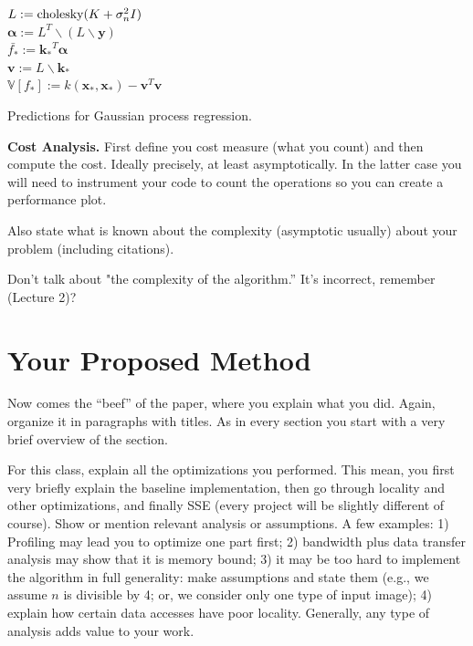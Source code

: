 \documentclass[letterpaper]{article}
\newcommand{\mypar}[1]{{\bf #1.}}
\begin{document}
\begin{algorithm}
    \label{alg:bayesianupdate}
    $L := \textnormal{cholesky}(K+\sigma^2_nI)$\\
    $\mathbf{\alpha}:=L^T\backslash(L\backslash\mathbf{y})$\\
    $\bar{f_*}:=\mathbf{k_*}^T\mathbf{\alpha}$\\
    $\mathbf{v}:=L\backslash\mathbf{k_*}$\\
    $\mathbb{V}[f_*]:=k(\mathbf{x_*}, \mathbf{x_*})-\mathbf{v}^T\mathbf{v}$\\
    \caption{Predictions for Gaussian process regression.}
\end{algorithm}


\mypar{Cost Analysis}
First define you cost measure (what you count) and then compute the
cost. Ideally precisely, at least asymptotically. In the latter case you will need to instrument your code to count
the operations so you can create a performance plot.

Also state what is
known about the complexity (asymptotic usually) 
about your problem (including citations).

Don't talk about "the complexity of the algorithm.'' It's incorrect,
remember (Lecture 2)?


\section{Your Proposed Method}\label{sec:yourmethod}

Now comes the ``beef'' of the paper, where you explain what you
did. Again, organize it in paragraphs with titles. As in every section
you start with a very brief overview of the section.

For this class, explain all the optimizations you performed. This mean, you first very briefly
explain the baseline implementation, then go through locality and other optimizations, and finally SSE (every project will be slightly different of course). Show or mention relevant analysis or assumptions. A few examples: 1) Profiling may lead you to optimize one part first; 2) bandwidth plus data transfer analysis may show that it is memory bound; 3) it may be too hard to implement the algorithm in full generality: make assumptions and state them (e.g., we assume $n$ is divisible by 4; or, we consider only one type of input image); 4) explain how certain data accesses have poor locality. Generally, any type of analysis adds value to your work.
\end{document}
